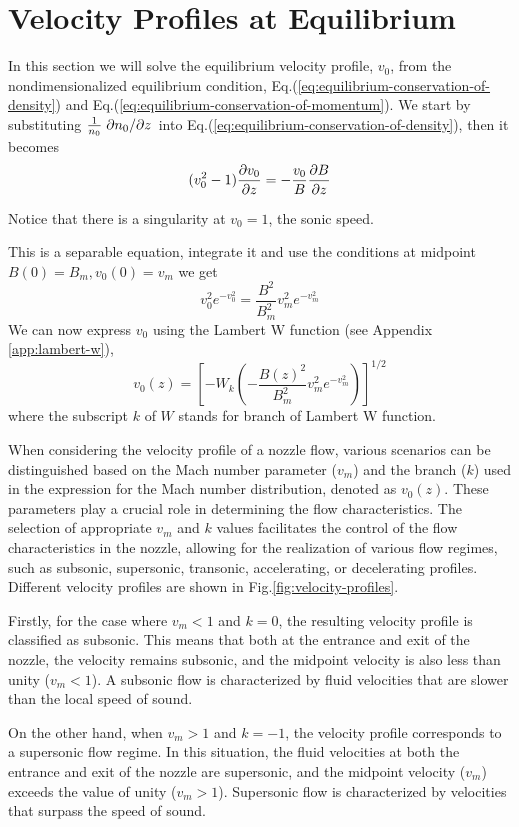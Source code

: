 \section{Velocity Profiles at Equilibrium}
In this section we will solve the equilibrium velocity profile, $v_0$, from the nondimensionalized equilibrium condition, Eq.(\ref{eq:equilibrium-conservation-of-density}) and Eq.(\ref{eq:equilibrium-conservation-of-momentum}).
We start by substituting $\frac{1}{n_0}\pdv*{n_0}{z}$ into Eq.(\ref{eq:equilibrium-conservation-of-density}), then it becomes
\[ (v_0^2-1)\pdv{v_0}{z} = -\frac{v_0}{B}\pdv{B}{z} \]

Notice that there is a singularity at $v_0=1$, the sonic speed.

This is a separable equation, integrate it and use the conditions at midpoint $B(0)=B_m, v_0(0)=v_m$ we get
\[ v_0^2e^{-v_0^2} = \frac{B^2}{B_m^2}v_m^2e^{-v_m^2} \]
We can now express $v_0$ using the Lambert W function (see Appendix \ref{app:lambert-w}),
\[ v_0(z) = \left[ -W_k\left(-\frac{B(z)^2}{B_m^2}v_m^2e^{-v_m^2}\right) \right]^{1/2} \]
where the subscript $k$ of $W$ stands for branch of Lambert W function.

When considering the velocity profile of a nozzle flow, various scenarios can be distinguished based on the Mach number parameter ($v_m$) and the branch ($k$) used in the expression for the Mach number distribution, denoted as $v_0(z)$. These parameters play a crucial role in determining the flow characteristics. The selection of appropriate $v_m$ and $k$ values facilitates the control of the flow characteristics in the nozzle, allowing for the realization of various flow regimes, such as subsonic, supersonic, transonic, accelerating, or decelerating profiles. Different velocity profiles are shown in Fig.\ref{fig:velocity-profiles}.

Firstly, for the case where $v_m < 1$ and $k = 0$, the resulting velocity profile is classified as subsonic. This means that both at the entrance and exit of the nozzle, the velocity remains subsonic, and the midpoint velocity is also less than unity ($v_m < 1$). A subsonic flow is characterized by fluid velocities that are slower than the local speed of sound.

On the other hand, when $v_m > 1$ and $k = -1$, the velocity profile corresponds to a supersonic flow regime. In this situation, the fluid velocities at both the entrance and exit of the nozzle are supersonic, and the midpoint velocity ($v_m$) exceeds the value of unity ($v_m > 1$). Supersonic flow is characterized by velocities that surpass the speed of sound.

